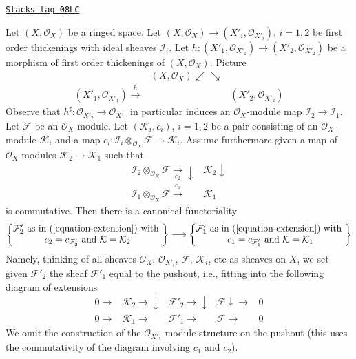 \begin{remark}
\label{defos-remark-extension-functorial}
\href{https://stacks.math.columbia.edu/tag/08LC}{\texttt{Stacks tag 08LC}}

Let $(X, \mathcal{O}_X)$ be a ringed space. Let
$(X, \mathcal{O}_X) \to (X'_i, \mathcal{O}_{X'_i})$, $i = 1, 2$
be first order thickenings with ideal sheaves $\mathcal{I}_i$.
Let $h : (X'_1, \mathcal{O}_{X'_1}) \to (X'_2, \mathcal{O}_{X'_2})$
be a morphism of first order thickenings of $(X, \mathcal{O}_X)$.
Picture
$$
\begin{array}{ccc} & (X, \mathcal{O}_X) \swarrow\searrow &  \\ (X'_1, \mathcal{O}_{X'_1}) \overset{h}{\longrightarrow} &  & (X'_2, \mathcal{O}_{X'_2})\end{array}
$$
Observe that $h^\sharp : \mathcal{O}_{X'_2} \to \mathcal{O}_{X'_1}$
in particular induces an $\mathcal{O}_X$-module map
$\mathcal{I}_2 \to \mathcal{I}_1$.
Let $\mathcal{F}$ be an
$\mathcal{O}_X$-module. Let $(\mathcal{K}_i, c_i)$, $i = 1, 2$ be a pair
consisting of an $\mathcal{O}_X$-module $\mathcal{K}_i$ and a map
$c_i : \mathcal{I}_i \otimes_{\mathcal{O}_X} \mathcal{F} \to
\mathcal{K}_i$. Assume furthermore given a map
of $\mathcal{O}_X$-modules $\mathcal{K}_2 \to \mathcal{K}_1$
such that
$$
\begin{array}{cc}\mathcal{I}_2 \otimes_{\mathcal{O}_X} \mathcal{F}
\underset{c_2}{\longrightarrow}\downarrow & \mathcal{K}_2 \downarrow \\ \mathcal{I}_1 \otimes_{\mathcal{O}_X} \mathcal{F}
\overset{c_1}{\longrightarrow} & \mathcal{K}_1\end{array}
$$
is commutative. Then there is a canonical functoriality
$$
\left\{
\begin{matrix}
\mathcal{F}'_2\text{ as in (\ref{equation-extension}) with }\\
c_2 = c_{\mathcal{F}'_2}\text{ and }\mathcal{K} = \mathcal{K}_2
\end{matrix}
\right\}
\longrightarrow
\left\{
\begin{matrix}
\mathcal{F}'_1\text{ as in (\ref{equation-extension}) with }\\
c_1 = c_{\mathcal{F}'_1}\text{ and }\mathcal{K} = \mathcal{K}_1
\end{matrix}
\right\}
$$
Namely, thinking of all sheaves $\mathcal{O}_X$, $\mathcal{O}_{X'_i}$,
$\mathcal{F}$, $\mathcal{K}_i$, etc as sheaves on $X$, we set
given $\mathcal{F}'_2$ the sheaf $\mathcal{F}'_1$ equal to the
pushout, i.e., fitting into the following diagram of extensions
$$
\begin{array}{ccccc}0 \longrightarrow & \mathcal{K}_2 \longrightarrow\downarrow & \mathcal{F}'_2 \longrightarrow\downarrow & \mathcal{F} \downarrow\longrightarrow & 0 \\ 0 \longrightarrow & \mathcal{K}_1 \longrightarrow & \mathcal{F}'_1 \longrightarrow & \mathcal{F} \longrightarrow & 0\end{array}
$$
We omit the construction of the $\mathcal{O}_{X'_1}$-module structure
on the pushout (this uses the commutativity of the diagram
involving $c_1$ and $c_2$).
\end{remark}

